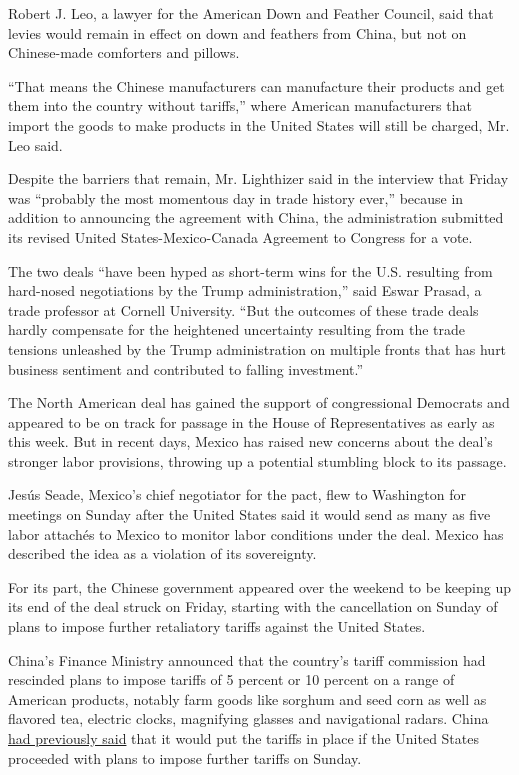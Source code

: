 Robert J. Leo, a lawyer for the American Down and Feather Council, said
that levies would remain in effect on down and feathers from China, but
not on Chinese-made comforters and pillows.

``That means the Chinese manufacturers can manufacture their products
and get them into the country without tariffs,'' where American
manufacturers that import the goods to make products in the United
States will still be charged, Mr. Leo said.

Despite the barriers that remain, Mr. Lighthizer said in the interview
that Friday was ``probably the most momentous day in trade history
ever,'' because in addition to announcing the agreement with China, the
administration submitted its revised United States-Mexico-Canada
Agreement to Congress for a vote.

The two deals ``have been hyped as short-term wins for the U.S.
resulting from hard-nosed negotiations by the Trump administration,''
said Eswar Prasad, a trade professor at Cornell University. ``But the
outcomes of these trade deals hardly compensate for the heightened
uncertainty resulting from the trade tensions unleashed by the Trump
administration on multiple fronts that has hurt business sentiment and
contributed to falling investment.''

The North American deal has gained the support of congressional
Democrats and appeared to be on track for passage in the House of
Representatives as early as this week. But in recent days, Mexico has
raised new concerns about the deal's stronger labor provisions, throwing
up a potential stumbling block to its passage.

Jesús Seade, Mexico's chief negotiator for the pact, flew to Washington
for meetings on Sunday after the United States said it would send as
many as five labor attachés to Mexico to monitor labor conditions under
the deal. Mexico has described the idea as a violation of its
sovereignty.

For its part, the Chinese government appeared over the weekend to be
keeping up its end of the deal struck on Friday, starting with the
cancellation on Sunday of plans to impose further retaliatory tariffs
against the United States.

China's Finance Ministry announced that the country's tariff commission
had rescinded plans to impose tariffs of 5 percent or 10 percent on a
range of American products, notably farm goods like sorghum and seed
corn as well as flavored tea, electric clocks, magnifying glasses and
navigational radars. China
\href{https://www.nytimes.com/2019/08/23/business/china-tariffs-trump.html}{had
previously said} that it would put the tariffs in place if the United
States proceeded with plans to impose further tariffs on Sunday.

